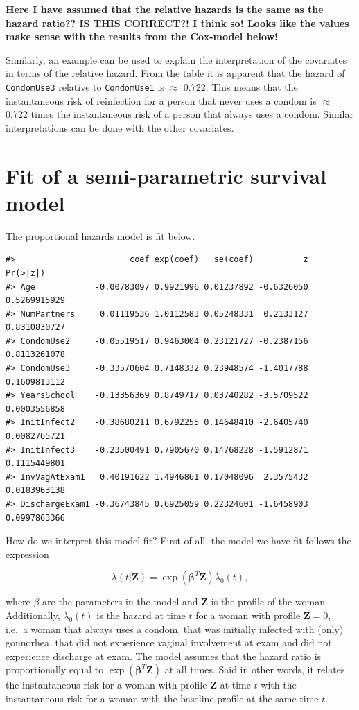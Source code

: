 \documentclass[
]{article}
\begin{document}
\textbf{Here I have assumed that the relative hazards is the same as the hazard ratio?? IS THIS CORRECT?! I think so! Looks like the values make sense with the results from the Cox-model below!}

Similarly, an example can be used to explain the interpretation of the covariates in terms of the relative hazard. From the table it is apparent that the hazard of \texttt{CondomUse3} relative to \texttt{CondomUse1} is \(\approx\) 0.722. This means that the instantaneous risk of reinfection for a person that never uses a condom is \(\approx\) 0.722 times the instantaneous risk of a person that always uses a condom. Similar interpretations can be done with the other covariates.

\hypertarget{fit-of-a-semi-parametric-survival-model}{%
\section{Fit of a semi-parametric survival model}\label{fit-of-a-semi-parametric-survival-model}}

The proportional hazards model is fit below.

\begin{verbatim}
#>                       coef exp(coef)   se(coef)          z     Pr(>|z|)
#> Age            -0.00783097 0.9921996 0.01237892 -0.6326050 0.5269915929
#> NumPartners     0.01119536 1.0112583 0.05248331  0.2133127 0.8310830727
#> CondomUse2     -0.05519517 0.9463004 0.23121727 -0.2387156 0.8113261078
#> CondomUse3     -0.33570604 0.7148332 0.23948574 -1.4017788 0.1609813112
#> YearsSchool    -0.13356369 0.8749717 0.03740282 -3.5709522 0.0003556858
#> InitInfect2    -0.38680211 0.6792255 0.14648410 -2.6405740 0.0082765721
#> InitInfect3    -0.23500491 0.7905670 0.14768228 -1.5912871 0.1115449801
#> InvVagAtExam1   0.40191622 1.4946861 0.17048096  2.3575432 0.0183963138
#> DischargeExam1 -0.36743845 0.6925059 0.22324601 -1.6458903 0.0997863366
\end{verbatim}

How do we interpret this model fit? First of all, the model we have fit follows the expression

\[
\lambda(t|\mathbf{Z}) =  \exp(\mathbf{\beta}^T\mathbf{Z})\lambda_0(t),  
\]

where \(\beta\) are the parameters in the model and \(\mathbf{Z}\) is the profile of the woman. Additionally, \(\lambda_0(t)\) is the hazard at time \(t\) for a woman with profile \(\mathbf{Z} = 0\), i.e.~a woman that always uses a condom, that was initially infected with (only) gonnorhea, that did not experience vaginal involvement at exam and did not experience discharge at exam. The model assumes that the hazard ratio is proportionally equal to \(\exp(\mathbf{\beta}^T\mathbf{Z})\) at all times. Said in other words, it relates the instantaneous risk for a woman with profile \(\mathbf{Z}\) at time \(t\) with the instantaneous risk for a woman with the baseline profile at the same time \(t\).
\end{document}
